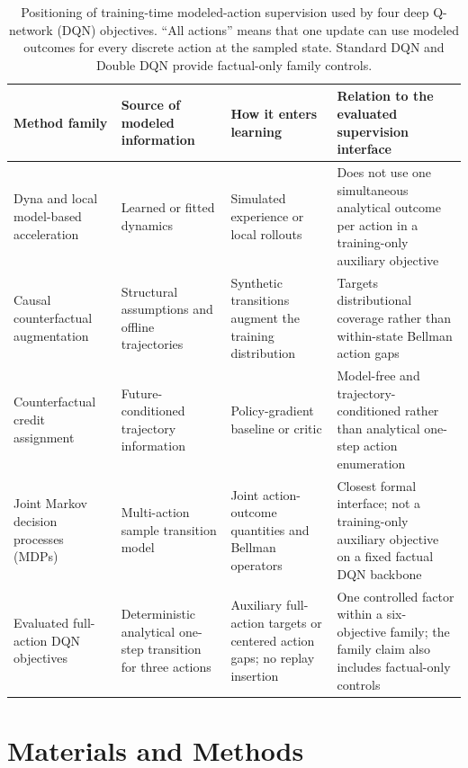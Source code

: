 \documentclass[remotesensing,article,submit,moreauthors]{Definitions/mdpi}
\begin{document}
\begin{table}[H]
\centering
\caption{Positioning of training-time modeled-action supervision used by four deep Q-network (DQN) objectives. ``All actions'' means that one update can use modeled outcomes for every discrete action at the sampled state. Standard DQN and Double DQN provide factual-only family controls.}
\label{tab:closest_methods}
\small
\setlength{\tabcolsep}{4pt}
\begingroup
\renewcommand\tabularxcolumn[1]{p{#1}}
\begin{tabularx}{\textwidth}{>{\raggedright\arraybackslash}p{}>{\raggedright\arraybackslash}p{}>{\raggedright\arraybackslash}p{}>{\raggedright\arraybackslash}X}
\toprule
Method family & Source of modeled information & How it enters learning & Relation to the evaluated supervision interface \\
\midrule
Dyna and local model-based acceleration~\cite{sutton1991dyna,gu2016continuous} & Learned or fitted dynamics & Simulated experience or local rollouts & Does not use one simultaneous analytical outcome per action in a training-only auxiliary objective \\
Causal counterfactual augmentation~\cite{armengol2024caiac} & Structural assumptions and offline trajectories & Synthetic transitions augment the training distribution & Targets distributional coverage rather than within-state Bellman action gaps \\
Counterfactual credit assignment~\cite{mesnard2021counterfactual} & Future-conditioned trajectory information & Policy-gradient baseline or critic & Model-free and trajectory-conditioned rather than analytical one-step action enumeration \\
Joint Markov decision processes (MDPs)~\cite{kaya2026joint} & Multi-action sample transition model & Joint action-outcome quantities and Bellman operators & Closest formal interface; not a training-only auxiliary objective on a fixed factual DQN backbone \\
Evaluated full-action DQN objectives & Deterministic analytical one-step transition for three actions & Auxiliary full-action targets or centered action gaps; no replay insertion & One controlled factor within a six-objective family; the family claim also includes factual-only controls \\
\bottomrule
\end{tabularx}
\endgroup
\end{table}

\section{Materials and Methods}
\end{document}
